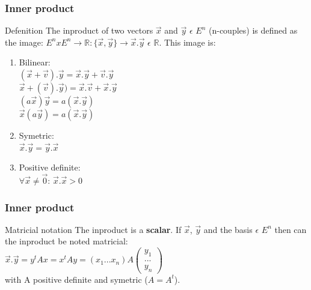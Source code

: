 \begin{frame}
	\frametitle{Inner product}
	\begin{block}{Defenition}
		The inproduct of two vectors $\overrightarrow{x}$ and $\overrightarrow{y}$ $\epsilon$ $E^n$ (n-couples) is defined as the image: $E^nxE^n\to\mathbb{R}:\{\overrightarrow{x},\overrightarrow{y}\}\to\overrightarrow{x}.\overrightarrow{y}$ $\epsilon$ $\mathbb{R}$. This image is:
		\begin{enumerate}
			\item Bilinear:\\ $(\overrightarrow{x}+\overrightarrow{v}).\overrightarrow{y}=\overrightarrow{x}.\overrightarrow{y}+\overrightarrow{v}.\overrightarrow{y}$\\
			$\overrightarrow{x}+(\overrightarrow{v}).\overrightarrow{y})=\overrightarrow{x}.\overrightarrow{v}+\overrightarrow{x}.\overrightarrow{y}$\\
			$(a\overrightarrow{x})\overrightarrow{y}=a(\overrightarrow{x}.\overrightarrow{y})$\\
			$\overrightarrow{x}(a\overrightarrow{y})=a(\overrightarrow{x}.\overrightarrow{y})$
			\item Symetric:\\
			$\overrightarrow{x}.\overrightarrow{y}=\overrightarrow{y}.\overrightarrow{x}$
			\item Positive definite:\\
			$\forall \overrightarrow{x} \neq \overrightarrow{0}$: $\overrightarrow{x} .\overrightarrow{x} > 0$
		\end{enumerate}
	\end{block}
\end{frame}

\begin{frame}
	\frametitle{Inner product}
	\begin{block}{Matricial notation}
		The inproduct is a {\bf scalar}. If $\overrightarrow{x}$, $\overrightarrow{y}$ and the basis $\epsilon$ $E^n$ then can the inproduct be noted matricial:\\
		$\overrightarrow{x}.\overrightarrow{y}=y^tAx=x^tAy=(x_1...x_n)A\begin{pmatrix} y_1\\...\\y_n\end{pmatrix}$\\
		with A positive definite and symetric ($A=A^t$).
	\end{block} 
\end{frame}

